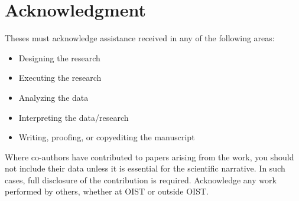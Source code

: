 \chapter*{Acknowledgment} 

Theses must acknowledge assistance received in any of the following areas:

\begin{itemize}
\item Designing the research
\item Executing the research
\item Analyzing the data
\item Interpreting the data/research
\item Writing, proofing, or copyediting the manuscript 
\end{itemize}

Where co-authors have contributed to papers arising from the work, you should not include their data unless it is essential for the scientific narrative.  In such cases, full disclosure of the contribution is required. Acknowledge any work performed by others, whether at OIST or outside OIST.
